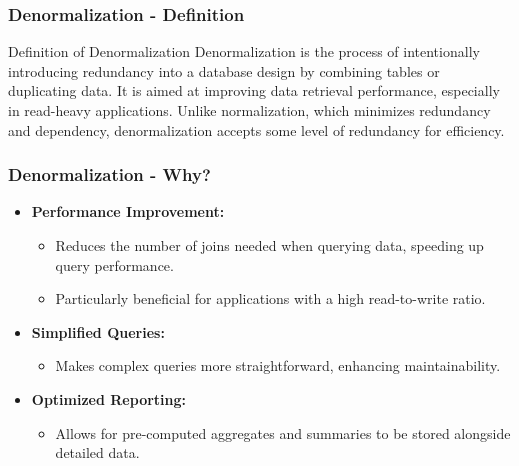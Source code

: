 \documentclass[aspectratio=169]{beamer}
\begin{document}
\begin{frame}[fragile]
    \frametitle{Denormalization - Definition}
    \begin{block}{Definition of Denormalization}
        Denormalization is the process of intentionally introducing redundancy into a database design by combining tables or duplicating data. It is aimed at improving data retrieval performance, especially in read-heavy applications. Unlike normalization, which minimizes redundancy and dependency, denormalization accepts some level of redundancy for efficiency.
    \end{block}
\end{frame}

\begin{frame}[fragile]
    \frametitle{Denormalization - Why?}
    \begin{itemize}
        \item \textbf{Performance Improvement:}
            \begin{itemize}
                \item Reduces the number of joins needed when querying data, speeding up query performance.
                \item Particularly beneficial for applications with a high read-to-write ratio.
            \end{itemize}
        
        \item \textbf{Simplified Queries:}
            \begin{itemize}
                \item Makes complex queries more straightforward, enhancing maintainability.
            \end{itemize}

        \item \textbf{Optimized Reporting:}
            \begin{itemize}
                \item Allows for pre-computed aggregates and summaries to be stored alongside detailed data.
            \end{itemize}
    \end{itemize}
\end{frame}
\end{document}
